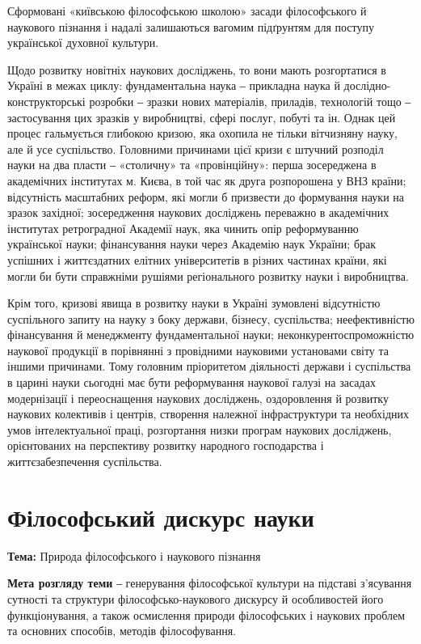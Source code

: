 Сформовані «київською філософською школою» засади філософського й
наукового пізнання і надалі залишаються вагомим підґрунтям для поступу
української духовної культури.

Щодо розвитку новітніх наукових досліджень, то вони мають розгортатися
в Україні в межах циклу: фундаментальна наука ‒ прикладна наука й дослідно-
конструкторські розробки ‒ зразки нових матеріалів, приладів, технологій тощо
‒ застосування цих зразків у виробництві, сфері послуг, побуті та ін. Однак цей
процес гальмується глибокою кризою, яка охопила не тільки вітчизняну науку,
але й усе суспільство. Головними причинами цієї кризи є штучний розподіл
науки на два пласти ‒ «столичну» та «провінційну»: перша зосереджена в
академічних інститутах м. Києва, в той час як друга розпорошена у ВНЗ країни;
відсутність масштабних реформ, які могли б призвести до формування науки на
зразок західної; зосередження наукових досліджень переважно в академічних
інститутах ретроградної Академії наук, яка чинить опір реформуванню
української науки; фінансування науки через Академію наук України; брак
успішних і життєздатних елітних університетів в різних частинах країни, які
могли би бути справжніми рушіями регіонального розвитку науки і
виробництва.

Крім того, кризові явища в розвитку науки в Україні зумовлені відсутністю
суспільного запиту на науку з боку держави, бізнесу, суспільства;
неефективністю фінансування й менеджменту фундаментальної науки;
неконкурентоспроможністю наукової продукції в порівнянні з провідними
науковими установами світу та іншими причинами. Тому головним
пріоритетом діяльності держави і суспільства в царині науки сьогодні має бути
реформування наукової галузі на засадах модернізації і переоснащення
наукових досліджень, оздоровлення й розвитку наукових колективів і центрів,
створення належної інфраструктури та необхідних умов інтелектуальної праці,
розгортання низки програм наукових досліджень, орієнтованих на перспективу
розвитку народного господарства і життєзабезпечення суспільства.

\section{Філософський дискурс науки}

\textbf{Тема:} Природа філософського і наукового пізнання

\textbf{Мета розгляду теми} ‒ генерування філософської культури на підставі
з’ясування сутності та структури філософсько-наукового дискурсу й
особливостей його функціонування, а також осмислення природи філософських
і наукових проблем та основних способів, методів філософування.

